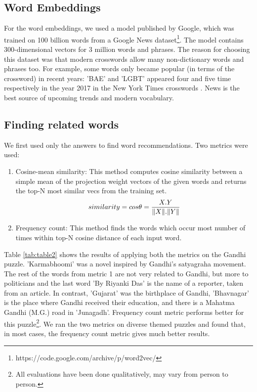 \documentclass[twoside]{article}
\begin{document}
\subsection{Word Embeddings}
\label{sec:sec3.1}
For the word embeddings, we used a model published by Google, which was trained on 100 billion words from a Google News dataset\footnote{https://code.google.com/archive/p/word2vec/}. The model contains 300-dimensional vectors for 3 million words and phrases. The reason for choosing this dataset was that modern crosswords allow many non-dictionary words and phrases too. For example, some words only became popular (in terms of the crossword) in recent years: 'BAE' and 'LGBT' appeared four and five time respectively in the year 2017 in the New York Times crosswords \cite{cite26}. News is the best source of upcoming trends and modern vocabulary.

\subsection{Finding related words}
\label{sec:sec3.2}
We first used only the answers to find word recommendations. Two metrics were used:
\begin{enumerate}
  \item Cosine-mean similarity: This method computes cosine similarity between a simple mean of the projection weight vectors of the given words and returns the top-N most similar vecs from the training set.
  \begin{equation}
  similarity = cos\theta = \frac{X.Y}{\norm{X}.\norm{Y}}
  \end{equation}
  \item Frequency count: This method finds the words which occur most number of times within top-N cosine distance of each input word.
\end{enumerate}
Table \ref{tab:table2} shows the results of applying both the metrics on the Gandhi puzzle. 'Karmabhoomi' was a novel inspired by Gandhi's satyagraha movement. The rest of the words from metric 1 are not very related to Gandhi, but more to politicians and the last word 'By Riyanki Das' is the name of a reporter, taken from an article. In contrast, 'Gujarat' was the birthplace of Gandhi, 'Bhavnagar' is the place where Gandhi received their education, and there is a Mahatma Gandhi (M.G.) road in 'Junagadh'. Frequency count metric performs better for this puzzle\footnote{All evaluations have been done qualitatively, may vary from person to person.}. We ran the two metrics on diverse themed puzzles and found that, in most cases, the frequency count metric gives much better results.
\end{document}
